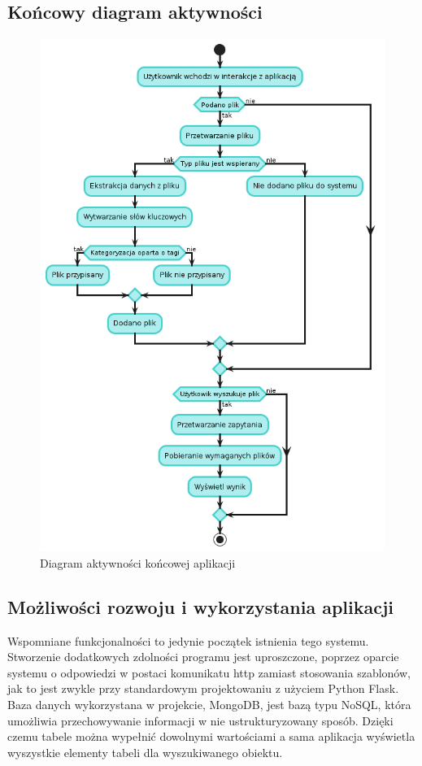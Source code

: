 \documentclass[12pt,a4paper,twoside]{article}
\begin{document}
\subsection{Końcowy diagram aktywności}
\begin{figure}[h!]
\centering
\includegraphics[width=\textwidth]{img/plantuml.png}
\caption{Diagram aktywności końcowej aplikacji}
\end{figure}
\subsection{Możliwości rozwoju i wykorzystania aplikacji}
Wspomniane funkcjonalności to jedynie początek istnienia tego systemu. Stworzenie dodatkowych zdolności programu jest uproszczone, poprzez oparcie systemu o odpowiedzi w postaci komunikatu http zamiast stosowania szablonów, jak to jest zwykle przy standardowym projektowaniu z użyciem Python Flask. Baza danych wykorzystana w projekcie, MongoDB, jest bazą typu NoSQL, która umożliwia przechowywanie informacji w nie ustrukturyzowany sposób. Dzięki czemu tabele można wypełnić dowolnymi wartościami a sama aplikacja wyświetla wyszystkie elementy tabeli dla wyszukiwanego obiektu.\par
\end{document}
